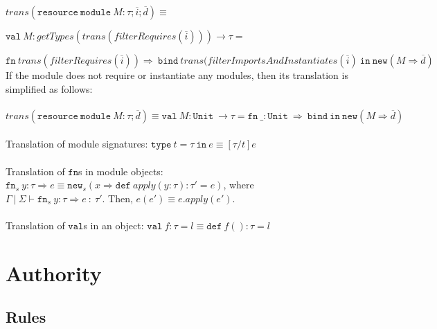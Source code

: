 \documentclass{llncs}
\newcommand{\keywadj}[1]{\mathtt{#1}}
\newcommand{\keyw}[1]{\keywadj{#1}~}
\begin{document}
\noindent$trans(\keyw{resource} \keyw{module} M : \tau; \overline{i}; \overline{d}) \equiv$

$\keyw{val} M : getTypes(trans(filterRequires(\overline{i}))) \rightarrow \tau = $

$\keyw{fn} trans(filterRequires(\overline{i})) \Rightarrow~\keyw{bind} trans(filterImportsAndInstantiates(\overline{i})~\keyw{in} \keywadj{new}(M \Rightarrow \overline{d})$\\

\noindent If the module does not require or instantiate any modules, then its translation is simplified as follows:
\\\\
\noindent$trans(\keyw{resource} \keyw{module} M : \tau; \overline{d}) \equiv \keyw{val} M : \keyw{Unit} \rightarrow \tau = \keyw{fn} \_ : \keyw{Unit} \Rightarrow~\keyw{bind} \keyw{in} \keywadj{new}(M \Rightarrow \overline{d})$
\\\\
Translation of module signatures: $\keyw{type} t = \tau~\keyw{in} e \equiv [\tau / t]e$
\\\\
Translation of $\keywadj{fn}$s in module objects: \mbox{$\keywadj{fn}_s~y : \tau \Rightarrow e \equiv \keywadj{new}_s(x \Rightarrow \keyw{def} apply(y : \tau) : \tau' = e)$}, where \\ \mbox{$\Gamma~|~\Sigma \vdash \keywadj{fn}_s~y : \tau \Rightarrow e~:~\tau'$}. Then, $e(e') \equiv e.apply(e')$.
\\\\
Translation of $\keywadj{val}$s in an object: $\keyw{val} f : \tau = l \equiv \keyw{def} f() : \tau = l$

\newpage

\section{Authority}

\subsection{Rules}
\end{document}
